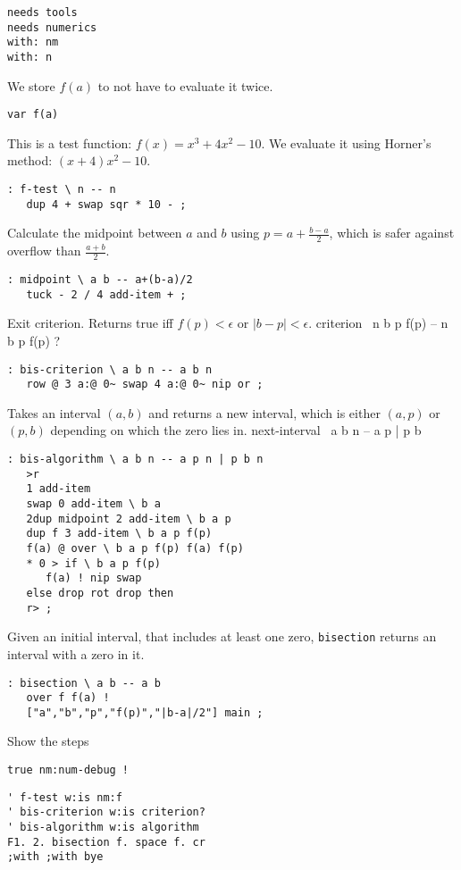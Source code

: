 \documentclass{article}
\begin{document}
\begin{verbatim}
needs tools
needs numerics
with: nm
with: n
\end{verbatim}
We store $f(a)$ to not have to evaluate it twice.
\begin{verbatim}
var f(a) 
\end{verbatim}
This is a test function: $f(x)=x^3+4x^2-10$. We evaluate it using
Horner's method: $(x+4)x^2-10$.
\begin{verbatim}
: f-test \ n -- n
   dup 4 + swap sqr * 10 - ;
\end{verbatim}
Calculate the midpoint between $a$ and $b$ using $p=a+\frac{b-a}{2}$,
which is safer against overflow than $\frac{a+b}{2}$.
\begin{verbatim}
: midpoint \ a b -- a+(b-a)/2
   tuck - 2 / 4 add-item + ; 
\end{verbatim}
Exit criterion. Returns true iff $f(p)<\epsilon$ or $|b-p|<\epsilon$.
criterion \ n b p f(p) -- n b p f(p) ?
\begin{verbatim}
: bis-criterion \ a b n -- a b n
   row @ 3 a:@ 0~ swap 4 a:@ 0~ nip or ;
\end{verbatim}
Takes an interval $(a,b)$ and returns a new interval, which is either
$(a,p)$ or $(p,b)$ depending on which the zero lies in. 
next-interval \ a b n --  a p | p b
\begin{verbatim}
: bis-algorithm \ a b n -- a p n | p b n
   >r 
   1 add-item
   swap 0 add-item \ b a
   2dup midpoint 2 add-item \ b a p
   dup f 3 add-item \ b a p f(p)
   f(a) @ over \ b a p f(p) f(a) f(p)
   * 0 > if \ b a p f(p)
      f(a) ! nip swap
   else drop rot drop then
   r> ;
\end{verbatim}
Given an initial interval, that includes at least one zero,
\texttt{bisection} returns an interval with a zero in it.
\begin{verbatim}
: bisection \ a b -- a b
   over f f(a) !
   ["a","b","p","f(p)","|b-a|/2"] main ;
\end{verbatim}
Show the steps
\begin{verbatim}
true nm:num-debug !
\end{verbatim}
\begin{verbatim}
' f-test w:is nm:f
' bis-criterion w:is criterion?
' bis-algorithm w:is algorithm
F1. 2. bisection f. space f. cr
;with ;with bye
\end{verbatim}
\end{document}
